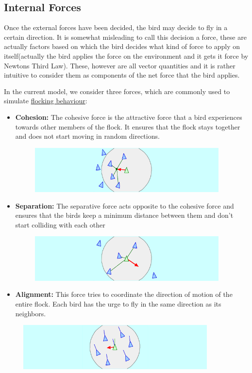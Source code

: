 \documentclass{article}
\begin{document}
\subsection{Internal Forces}
Once the external forces have been decided, the bird may decide to fly in a certain direction. It is somewhat misleading to call this decision a force, these are actually factors based on which the bird decides what kind of force to apply on itself(actually the bird applies the force on the environment and it gets it force by Newtons Third Law). These, however are all vector quantities and it is rather intuitive to consider them as components of the net force that the bird applies. 

In the current model, we consider three forces, which are commonly used to simulate \href{https://en.wikipedia.org/wiki/Flocking_(behavior)}{flocking behaviour}:
\begin{itemize}
    \item \textbf{Cohesion:} The cohesive force is the attractive force that a bird experiences towards other members of the flock. It ensures that the flock stays together and does not start moving in random directions.
\begin{figure}[h]
\centering
\includegraphics[width=10cm]{cohesion600}
\end{figure}
\item \textbf{Separation:} The separative force acts opposite to the cohesive force and ensures that the birds keep a minimum distance between them and don't start colliding with each other
\begin{figure}[h]
\centering
\includegraphics[width=10cm]{separation600}
\end{figure}
    \item \textbf{Alignment:} This force tries to coordinate the direction of motion of the entire flock. Each bird has the urge to fly in the same direction as its neighbors.
\end{itemize}
\begin{figure}[h]
\centering
\includegraphics[width=10cm]{alignment600}
\end{figure}
\end{document}
